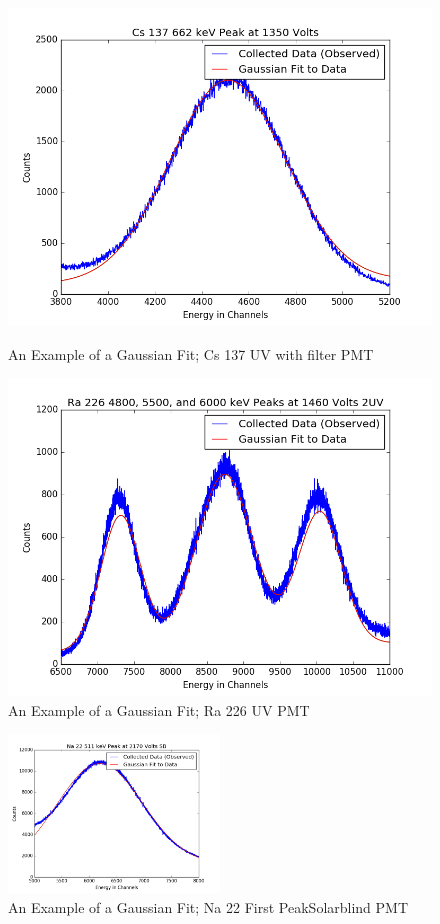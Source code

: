 \documentclass{article}
\begin{document}
\begin{figure}[H]
  \centering
  \begin{minipage}[b]{0.4\textwidth}
    \includegraphics[width=\textwidth]{FilCsfit.png}
    \caption{An Example of a Gaussian Fit; Cs 137 UV with filter PMT}
  \end{minipage}
  \hfill
  \begin{minipage}[b]{0.4\textwidth}
    \includegraphics[width=\textwidth]{2UVRa1fit.png}
    \caption{An Example of a Gaussian Fit; Ra 226 UV PMT}
  \end{minipage}
\end{figure}

\begin{figure}
  \centering
    \includegraphics[width=0.5\textwidth]{SBNa1fit.png}
  \caption{An Example of a Gaussian Fit; Na 22 First PeakSolarblind PMT}
  \label{fig:workflowedge}
\end{figure} 
\end{document}
